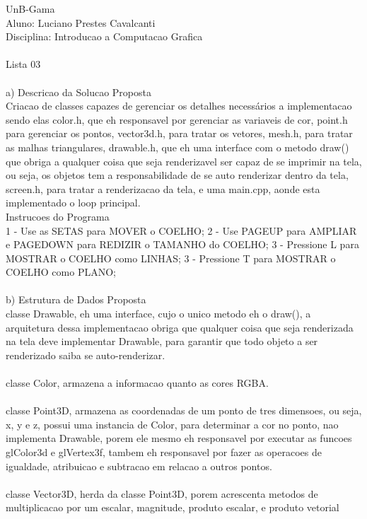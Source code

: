 \documentclass{article}
\begin{document}
UnB-Gama \\
Aluno: Luciano Prestes Cavalcanti \\
Disciplina: Introducao a Computacao Grafica \\
\\
Lista 03
\\
\\
a) Descricao da Solucao Proposta
\\
Criacao de classes capazes de gerenciar os detalhes necessários a implementacao
sendo elas color.h, que eh responsavel por gerenciar as variaveis de cor,
point.h para gerenciar os pontos, vector3d.h, para tratar os vetores,
mesh.h, para tratar as malhas triangulares, drawable.h, que eh uma
interface com o metodo draw() que obriga a qualquer coisa que seja
renderizavel ser capaz de se imprimir na tela, ou seja, os objetos
tem a responsabilidade de se auto renderizar dentro da tela,
screen.h, para tratar a renderizacao da tela, e uma main.cpp,
aonde esta implementado o loop principal.
\\
Instrucoes do Programa
\\
1 - Use as SETAS para MOVER o COELHO;
2 - Use PAGEUP para AMPLIAR e PAGEDOWN para REDIZIR o TAMANHO do COELHO;
3 - Pressione L para MOSTRAR o COELHO como LINHAS;
3 - Pressione T para MOSTRAR o COELHO como PLANO;
\\
\\
b) Estrutura de Dados Proposta
\\
classe Drawable, eh uma interface, cujo o unico metodo eh o draw(),
a arquitetura dessa implementacao obriga que qualquer coisa que seja
renderizada na tela deve implementar Drawable, para garantir que todo
objeto a ser renderizado saiba se auto-renderizar.
\\
\\
classe Color, armazena a informacao quanto as cores RGBA.
\\
\\
classe Point3D, armazena as coordenadas de um ponto de tres dimensoes,
ou seja, x, y e z, possui uma instancia de Color, para determinar a cor
no ponto, nao implementa Drawable, porem ele mesmo eh responsavel por
executar as funcoes glColor3d e glVertex3f, tambem eh responsavel por
fazer as operacoes de igualdade, atribuicao e subtracao em relacao a
outros pontos.
\\
\\
classe Vector3D, herda da classe Point3D, porem acrescenta metodos
de multiplicacao por um escalar, magnitude, produto escalar, e
produto vetorial
\\
\end{document}

